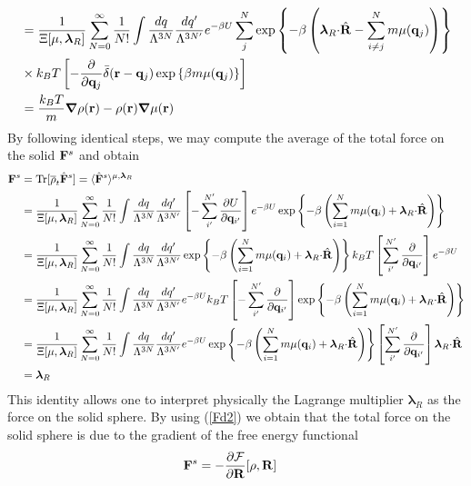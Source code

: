 \documentclass[b5paper,openright,10pt]{book}
\begin{document}
\begin{appendices}
\begin{align}
&=
\frac{1}{\Xi[\mu,\boldsymbol{\lambda}_R]}
 \sum_{N=0}^\infty \frac{1}{N!}
\int \frac{dq}{\Lambda^{3N}}\frac{dq'}{\Lambda^{3N'}}
e^{-\beta U}
\sum^{N}_{j}\exp\left\{-\beta  \left( \boldsymbol{\lambda}_R{\cdot}\hat{\bf R}
-\sum_{i\neq j}^N m\mu({\bf   q}_j)\right)\right\}
\nonumber\\
&\times k_BT\left[-\frac{\partial }{\partial {\bf q}_{j}}\bar{\delta}({\bf r}-{\bf q}_j)
\exp\left\{\beta   m\mu({\bf   q}_j)\right\}\right]
\nonumber\\
&=\frac{k_BT}{m}\boldsymbol{\nabla} \rho({\bf r})
-\rho({\bf r})\boldsymbol{\nabla}\mu({\bf r})
\label{fllr}
\end{align}
By following identical steps, we may compute the average of the total force on the solid ${\bf F}^s$
and obtain
\begin{align}
{\bf F}^s&={\rm Tr}[\overline{\rho}_t \hat{\bf F}^s]=
 \langle \hat{\bf F}^s\rangle^{\mu,\boldsymbol{\lambda}_R} 
\nonumber\\
&=\frac{1}{\Xi[\mu,\boldsymbol{\lambda}_R]}
 \sum_{N=0}^\infty \frac{1}{N!}
\int \frac{dq}{\Lambda^{3N}}\frac{dq'}{\Lambda^{3N'}}
\left[-\sum^{N'}_{i'}\frac{\partial U}{\partial {\bf q}_{i'}}\right]
e^{-\beta U}
\exp\left\{-\beta  \left(\sum_{i=1}^N m\mu({\bf
    q}_i)+ \boldsymbol{\lambda}_R{\cdot}\hat{\bf R}\right)\right\}
\nonumber\\
&=
\frac{1}{\Xi[\mu,\boldsymbol{\lambda}_R]}
 \sum_{N=0}^\infty \frac{1}{N!}
\int \frac{dq}{\Lambda^{3N}}\frac{dq'}{\Lambda^{3N'}}
\exp\left\{-\beta  \left(\sum_{i=1}^N m\mu({\bf
    q}_i)+ \boldsymbol{\lambda}_R{\cdot}\hat{\bf R}\right)\right\}
k_BT\left[\sum^{N'}_{i'}\frac{\partial }{\partial {\bf q}_{i'}}\right]e^{-\beta U}
\nonumber\\
&=
\frac{1}{\Xi[\mu,\boldsymbol{\lambda}_R]}
 \sum_{N=0}^\infty \frac{1}{N!}
\int \frac{dq}{\Lambda^{3N}}\frac{dq'}{\Lambda^{3N'}}
e^{-\beta U}
k_BT\left[-\sum^{N'}_{i'}\frac{\partial }{\partial {\bf q}_{i'}}\right]\exp\left\{-\beta  \left(\sum_{i=1}^N m\mu({\bf
    q}_i)+ \boldsymbol{\lambda}_R{\cdot}\hat{\bf R}\right)\right\}
\nonumber\\
&=
\frac{1}{\Xi[\mu,\boldsymbol{\lambda}_R]}
 \sum_{N=0}^\infty \frac{1}{N!}
\int \frac{dq}{\Lambda^{3N}}\frac{dq'}{\Lambda^{3N'}}
e^{-\beta U}
\exp\left\{-\beta  \left(\sum_{i=1}^N m\mu({\bf
    q}_i)+ \boldsymbol{\lambda}_R{\cdot}\hat{\bf R}\right)\right\}
\left[\sum^{N'}_{i'}\frac{\partial }{\partial {\bf q}_{i'}}\right] \boldsymbol{\lambda}_R{\cdot}\hat{\bf R}
\nonumber\\
&=\boldsymbol{\lambda}_R
\label{lf}\end{align}
This  identity  allows  one  to  interpret  physically  the  Lagrange
multiplier $\boldsymbol{\lambda}_R$ as the  force on the solid sphere.
By  using (\ref{Fd2})  we obtain  that the  total force  on the  solid
sphere is due to the gradient of the free energy functional
\begin{align}
{\bf F}^s&=-\frac{\partial  {\cal F}}{\partial{\bf R}}[\rho,{\bf R}]
\label{Fls}
\end{align}


\end{appendices}
\end{document}
